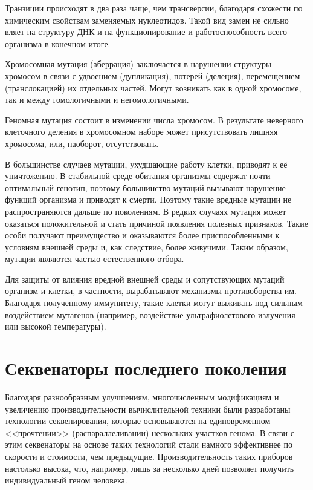 Транзиции происходят в два раза чаще, чем трансверсии, благодаря схожести по химическим свойствам заменяемых нуклеотидов. Такой вид замен не сильно вляет на структуру ДНК и на функционирование и работоспособность всего организма в конечном итоге.

Хромосомная мутация (аберрация) заключается в нарушении структуры хромосом в связи с удвоением (дупликация), потерей (делеция), перемещением (транслокацией) их отдельных частей. Могут возникать как в одной хромосоме, так и между гомологичными и негомологичными.

Геномная мутация состоит в изменении числа хромосом. В результате неверного клеточного деления в хромосомном наборе может присутствовать лишняя хромосома, или, наоборот, отсутствовать.

В большинстве случаев мутации, ухудшающие работу клетки, приводят к её уничтожению. В стабильной среде обитания организмы содержат почти оптимальный генотип, поэтому большинство мутаций вызывают нарушение функций организма и приводят к смерти. Поэтому такие вредные мутации не распространяются дальше по поколениям. В редких случаях мутация может оказаться положительной и стать причиной появления полезных признаков. Такие особи получают преимущество и оказываются более приспособленными к условиям внешней среды и, как следствие, более живучими. Таким образом, мутации являются частью естественного отбора.

Для защиты от влияния вредной внешней среды и сопутствующих мутаций организм и клетки, в частности, вырабатывают механизмы противоборства им. Благодаря полученному иммунитету, такие клетки могут выживать под сильным воздействием мутагенов (например,  воздействие ультрафиолетового излучения или высокой температуры).

\section{Секвенаторы последнего поколения}

Благодаря разнообразным улучшениям, многочисленным модификациям и увеличению производительности вычислительной техники были разработаны технологии секвенирования, которые основываются на единовременном <<прочтении>> (распараллеливании) нескольких участков генома. В связи с этим секвенаторы на основе таких технологий стали намного эффективнее по скорости и стоимости, чем предыдущие. Производительность таких приборов настолько высока, что, например, лишь за несколько дней позволяет получить индивидуальный геном человека.

